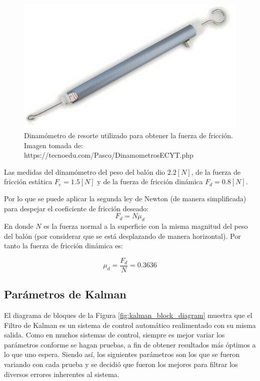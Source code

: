 \begin{figure}
\centering
\includegraphics[scale=0.4]{images/dynamometer.jpg}
\caption{Dinamómetro de resorte utilizado para obtener la fuerza de fricción. Imagen tomada de: https://tecnoedu.com/Pasco/DinamometrosECYT.php}
\label{fig:dynamometer}
\end{figure}	

	Las medidas del dinamómetro del peso del balón dio $2.2[N]$, de la fuerza de fricción estática $F_{e} = 1.5[N]$ y de la fuerza de fricción dinámica $F_{d} = 0.8[N]$. 

	Por lo que se puede aplicar la segunda ley de Newton (de manera simplificada) para despejar el coeficiente de fricción deseado:
\begin{equation}
F_d = N\mu_d 
\end{equation}
	En donde $N$ es la fuerza normal a la superficie con la misma magnitud del peso del balón (por considerar que se está desplazando de manera horizontal). Por tanto la fuerza de fricción dinámica es:
	
\begin{equation}
	\mu_d = \frac{F_d}{N}
	      = 0.3636		
	\label{eq:mu_d}
\end{equation}
	
		\subsection*{Parámetros de Kalman}
		El diagrama de bloques de la Figura \ref{fig:kalman_block_diagram} muestra que el Filtro de Kalman es un sistema de control automático realimentado con su misma salida. Como en muchos sistemas de control, siempre es mejor variar los parámetros conforme se hagan pruebas, a fin de obtener resultados más óptimos a lo que uno espera. Siendo así, los siguientes parámetros son los que se fueron variando con cada prueba y se decidió que fueron los mejores para filtrar los diversos errores inherentes al sistema. 
		

